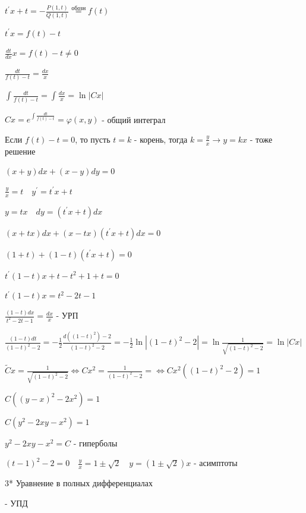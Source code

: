\documentclass[12pt]{article}
\begin{document}
    $\displaystyle t^\prime x + t = -\frac{P(1, t)}{Q(1, t)} \stackrel{\text{обозн}}{=} f(t)$

    $\displaystyle t^\prime x = f(t) - t$

    $\displaystyle \frac{dt}{dx}x = f(t) - t \neq 0$

    $\displaystyle \frac{dt}{f(t) - t} = \frac{dx}{x}$

    $\displaystyle \int\frac{dt}{f(t) - t} = \int\frac{dx}{x} = \ln|Cx|$

    $\displaystyle Cx = e^{\int\frac{dt}{f(t) - t}} = \varphi(x, y)$ - общий интеграл

    Если $f(t) - t = 0$, то пусть $t = k$ - корень, тогда $\displaystyle k = \frac{y}{x} \to y = kx$ - тоже решение

    \Ex $(x + y)dx + (x - y)dy = 0$

    $\displaystyle \frac{y}{x} = t \quad y^\prime = t^\prime x + t$

    $\displaystyle y = tx \quad dy = (t^\prime x + t)dx$

    $\displaystyle (x + tx)dx + (x - tx)(t^\prime x + t)dx = 0$

    $\displaystyle (1 + t) + (1 - t)(t^\prime x + t) = 0$

    $\displaystyle t^\prime (1 - t) x + t - t^2 + 1 + t = 0$

    $\displaystyle t^\prime (1 - t) x = t^2 - 2t - 1$

    $\displaystyle \frac{(1 - t) dx}{t^2 - 2t - 1} = \frac{dx}{x}$ - УРП

    $\displaystyle \frac{(1 - t)dt}{(1 - t)^2 - 2} = -\frac{1}{2}\frac{d((1 - t)^2) - 2}{(1 - t)^2 - 2} = -\frac{1}{2}\ln|(1 - t)^2 - 2| = \ln\frac{1}{\sqrt{(1 - t)^2 - 2}} = \ln|Cx|$

    $\displaystyle \tilde{C}x = \frac{1}{\sqrt{(1 - t)^2 - 2}} \Longleftrightarrow Cx^2 = \frac{1}{(1 - t)^2 - 2} = \Longleftrightarrow Cx^2 ((1 - t)^2 - 2) = 1$

    $\displaystyle C ((y - x)^2 - 2x^2) = 1$

    $\displaystyle C (y^2 - 2xy - x^2) = 1$

    $\displaystyle y^2 - 2xy - x^2 = C$ - гиперболы

    $\displaystyle (t - 1)^2 - 2 = 0 \quad \frac{y}{x} = 1 \pm \sqrt{2} \quad y = (1 \pm \sqrt{2})x$ - асимптоты

    3* Уравнение в полных дифференциалах

    \Def {} - УПД
\end{document}
